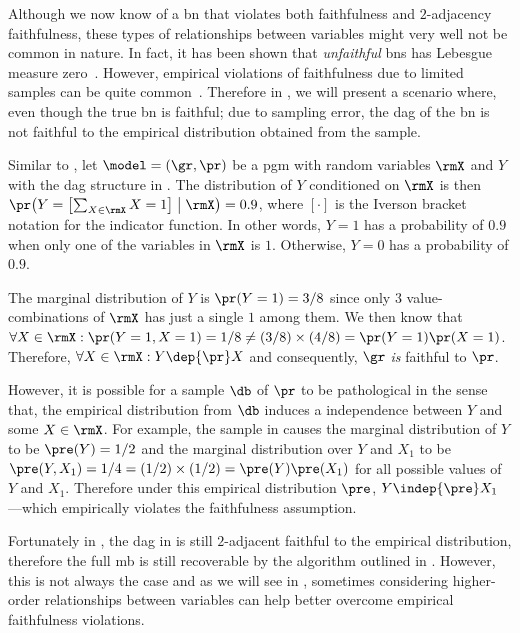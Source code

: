 \documentclass[accepted]{uai2026} %
\theoremstyle{plain}
\theoremstyle{definition}
\theoremstyle{remark}
\begin{document}
Although we now know of a \gls{bn} that violates both faithfulness and
$2$-adjacency faithfulness, these types of relationships between
variables might very well not be common in nature. In fact, it has been
shown that \emph{unfaithful} \glspl{bn} has Lebesgue measure
zero~\citep{meek1995,spirtes2001,boeken2025}. However, empirical
violations of faithfulness due to limited samples can be quite
common~\citep{uhler2013,lemeire2012,boeken2025}. Therefore in
, we will present a scenario where, even though the true
\gls{bn} is faithful; due to sampling error, the \gls{dag} of the
\gls{bn} is not faithful to the empirical distribution obtained from the
sample.
  
\begin{example}\label{ex:sample}
  Similar to , let $\model=(\gr,\pr)$ be a \gls{pgm}
  with random variables $\rmX$ and $Y$ with the \gls{dag} structure in
  . The distribution of $Y$ conditioned on $\rmX$ is
  then
  $\pr\bigl(Y=\bigl[\sum_{X\in\rmX}X=1\bigr] \bigm| \rmX \bigr) = 0.9$,
  where $[\cdot]$ is the Iverson bracket notation for the indicator
  function. In other words, $Y=1$ has a probability of $0.9$ when only
  one of the variables in $\rmX$ is $1$. Otherwise, $Y=0$ has a
  probability of $0.9$.

  The marginal distribution of $Y$ is $\pr(Y=1)=3/8$ since only 3
  value-combinations of $\rmX$ has just a single $1$ among them. We then
  know that
  $\forall X \in \rmX : \pr(Y=1,X=1)=1/8\neq
  (3/8)\times(4/8)=\pr(Y=1)\pr(X=1)$. Therefore, $\forall X\in\rmX : Y
  \dep{\pr} X$ and consequently, $\gr$ \emph{is} faithful to $\pr$.

  However, it is possible for a sample $\db$ of $\pr$ to be pathological
  in the sense that, the empirical distribution from $\db$ induces a
  independence between $Y$ and some $X\in\rmX$. For example, the sample
  in  causes the marginal distribution of $Y$ to be
  $\pre(Y)=1/2$ and the marginal distribution over $Y$ and $X_{1}$ to be
  $\pre(Y,X_{1})=1/4=(1/2)\times(1/2)=\pre(Y)\pre(X_{1})$ for all
  possible values of $Y$ and $X_{1}$. Therefore under this empirical
  distribution $\pre$, $Y\indep{\pre}X_{1}$---which empirically violates
  the faithfulness assumption.
\end{example}

Fortunately in , the \gls{dag} in  is
still $2$-adjacent faithful to the empirical distribution, therefore the
full \gls{mb} is still recoverable by the algorithm outlined in
\citet{marx2021}. However, this is not always the case and as we will
see in , sometimes considering higher-order
relationships between variables can help better overcome empirical
faithfulness violations.
\end{document}
